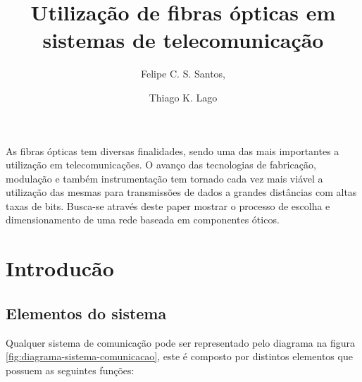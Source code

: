 \documentclass[article]{IEEEtran}
\begin{document}
%
\title{Utilização de fibras ópticas em sistemas de telecomunicação}




\author{
	Felipe C. S. Santos,
	\and
	Thiago K. Lago
	
}






\maketitle

\IEEEdisplaynontitleabstractindextext
As fibras ópticas tem diversas finalidades, sendo uma das mais importantes a utilização em telecomunicações. O avanço das tecnologias de fabricação, modulação e também instrumentação tem tornado cada vez mais viável a utilização das mesmas para transmissões de dados a grandes distâncias com altas taxas de bits. Busca-se através deste paper mostrar o processo de escolha e dimensionamento de uma rede baseada em componentes óticos.
\IEEEpeerreviewmaketitle



\section{Introducão}
\subsection{Elementos do sistema}
\par Qualquer sistema de comunicação pode ser representado pelo diagrama na figura \ref{fig:diagrama-sistema-comunicacao}, este é composto por distintos elementos que possuem as seguintes funções: \cite{FUND_OPT}
\end{document}
